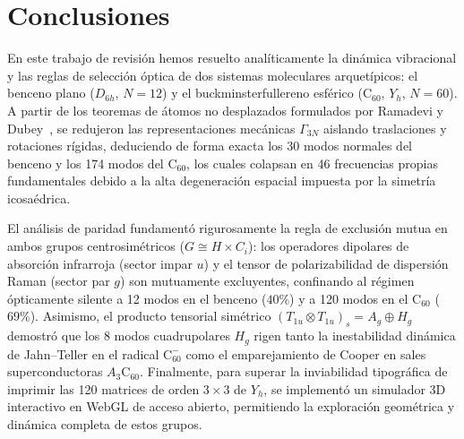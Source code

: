 \section{Conclusiones}
En este trabajo de revisión hemos resuelto analíticamente la dinámica vibracional y las reglas de selección óptica de dos sistemas moleculares arquetípicos: el benceno plano ($D_{6h}$, $N=12$) y el buckminsterfullereno esférico ($\text{C}_{60}$, $Y_h$, $N=60$). A partir de los teoremas de átomos no desplazados formulados por Ramadevi y Dubey~\cite{Ramadevi2019}, se redujeron las representaciones mecánicas $\Gamma_{3N}$ aislando traslaciones y rotaciones rígidas, deduciendo de forma exacta los 30 modos normales del benceno y los 174 modos del $\text{C}_{60}$, los cuales colapsan en 46 frecuencias propias fundamentales debido a la alta degeneración espacial impuesta por la simetría icosaédrica.

El análisis de paridad fundamentó rigurosamente la regla de exclusión mutua en ambos grupos centrosimétricos ($G \cong H \times C_i$): los operadores dipolares de absorción infrarroja (sector impar $u$) y el tensor de polarizabilidad de dispersión Raman (sector par $g$) son mutuamente excluyentes, confinando al régimen ópticamente silente a 12 modos en el benceno ($40\%$) y a 120 modos en el $\text{C}_{60}$ ($69\%$). Asimismo, el producto tensorial simétrico $(T_{1u} \otimes T_{1u})_s = A_g \oplus H_g$ demostró que los 8 modos cuadrupolares $H_g$ rigen tanto la inestabilidad dinámica de Jahn--Teller en el radical $\text{C}_{60}^-$ como el emparejamiento de Cooper en sales superconductoras $A_3\text{C}_{60}$. Finalmente, para superar la inviabilidad tipográfica de imprimir las 120 matrices de orden $3 \times 3$ de $Y_h$, se implementó un simulador 3D interactivo en WebGL de acceso abierto, permitiendo la exploración geométrica y dinámica completa de estos grupos.
